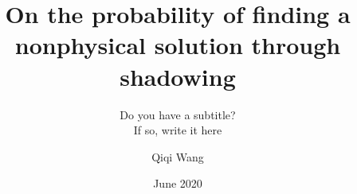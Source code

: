 %
%
%
%
%
%
\RequirePackage{fix-cm}
%
\documentclass[smallextended]{svjour3}       %
%
\smartqed  %
%
%
%
%
\usepackage[utf8]{inputenc}
\usepackage{graphicx, float}
\usepackage{amsmath, amssymb, amsfonts}
\usepackage{xcolor}
\newcommand{\nisha}[1]{{\color{darkgreen} #1}}


\title{On the probability of finding a nonphysical solution through shadowing}
\date{June 2020}
\subtitle{Do you have a subtitle?\\ If so, write it here}


\author{Qiqi Wang}



